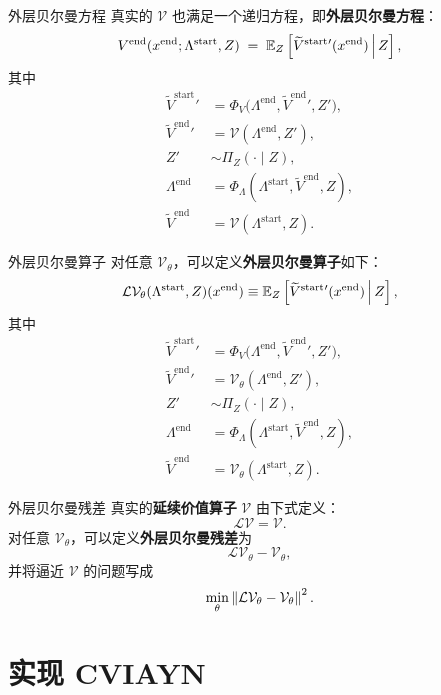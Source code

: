 \documentclass[10pt,aspectratio=169]{beamer}
\newcommand{\Vend}{V^{\mathrm{end}}}
\newcommand{\Vstarttil}{\widetilde{V}^{\mathrm{start}}}
\newcommand{\Vendtil}{\widetilde{V}^{\mathrm{end}}}
\newcommand{\Lstart}{\Lambda^{\mathrm{start}}}
\newcommand{\Lend}{\Lambda^{\mathrm{end}}}
\newcommand{\xend}{x^{\mathrm{end}}}
\newcommand{\CV}{\mathcal{V}}
\begin{document}
\begin{frame}{外层贝尔曼方程}
  真实的 $\CV$ 也满足一个递归方程，即\textbf{外层贝尔曼方程}：
  \[
    \Vend(\xend; \Lstart, Z) \;=\; \E_Z\psq{\Vstarttil{}'(\xend)\,\Big|\, Z},
  \]
  其中
  \begin{align*}
    \Vstarttil{}'  &= \Phi_V\bigl(\Lend, \Vendtil{}', Z'\bigr), \\
    \Vendtil{}' &= \CV(\Lambda^\text{end}, Z'), \\
    Z' &\sim \Pi_Z(\cdot \mid Z), \\
    \Lend &= \Phi_\Lambda(\Lstart, \Vendtil, Z), \\
    \Vendtil &= \CV(\Lstart, Z).
  \end{align*}
\end{frame}

\begin{frame}{外层贝尔曼算子}
  对任意 $\CV_\theta$，可以定义\textbf{外层贝尔曼算子}如下：
  \[
    \mathcal{L}\CV_\theta(\Lstart, Z)(\xend) \equiv \E_Z\psq{\Vstarttil{}'(\xend)\,\Big|\, Z},
  \]
  其中
  \begin{align*}
    \Vstarttil{}'  &= \Phi_V\bigl(\Lend, \Vendtil{}', Z'\bigr), \\
    \Vendtil{}' &= \CV_\theta(\Lambda^\text{end}, Z'), \\
    Z' &\sim \Pi_Z(\cdot \mid Z), \\
    \Lend &= \Phi_\Lambda(\Lstart, \Vendtil, Z), \\
    \Vendtil &= \CV_\theta(\Lstart, Z).
  \end{align*}
\end{frame}

\begin{frame}{外层贝尔曼残差}
  真实的\textbf{延续价值算子} $\CV$ 由下式定义：
  \[
    \mathcal{L}\CV = \CV.
  \]
  对任意 $\CV_\theta$，可以定义\textbf{外层贝尔曼残差}为
  \[
    \mathcal{L}\CV_\theta - \CV_\theta,
  \]
  并将逼近 $\CV$ 的问题写成
  \[
    \min_\theta \norm{\mathcal{L}\CV_\theta - \CV_\theta}^2.
  \]
\end{frame}

\section[实现 CVIAYN]{实现 CVIAYN}
\end{document}
